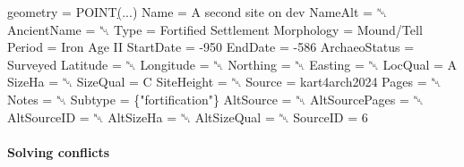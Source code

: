 \documentclass[
  letterpaper,
  DIV=11,
  numbers=noendperiod]{scrartcl}
\let\oldparagraph\paragraph
\renewcommand{\paragraph}[1]{\oldparagraph{#1}\mbox{}}
\newenvironment{Shaded}{\begin{snugshade}}{\end{snugshade}}
\newcommand{\AttributeTok}[1]{\textcolor[rgb]{1.00,0.47,0.78}{#1}}
\newcommand{\ErrorTok}[1]{\textcolor[rgb]{1.00,0.33,0.33}{\underline{#1}}}
\newcommand{\ExtensionTok}[1]{\textcolor[rgb]{0.55,0.91,0.99}{#1}}
\newcommand{\KeywordTok}[1]{\textcolor[rgb]{1.00,0.47,0.78}{#1}}
\newcommand{\NormalTok}[1]{\textcolor[rgb]{0.97,0.97,0.95}{#1}}
\newcommand{\StringTok}[1]{\textcolor[rgb]{0.95,0.98,0.55}{#1}}
\begin{document}
\begin{tcolorbox}
\begin{Shaded}
\begin{Highlighting}[]
                                \ExtensionTok{geometry}\NormalTok{ = POINT}\ErrorTok{(}\ExtensionTok{...}\KeywordTok{)}
                                    \ExtensionTok{Name}\NormalTok{ = A second site on dev}
                                 \ExtensionTok{NameAlt}\NormalTok{ = ␀}
                             \ExtensionTok{AncientName}\NormalTok{ = ␀}
                                    \ExtensionTok{Type}\NormalTok{ = Fortified Settlement}
                              \ExtensionTok{Morphology}\NormalTok{ = Mound/Tell}
                                  \ExtensionTok{Period}\NormalTok{ = Iron Age II}
                               \ExtensionTok{StartDate}\NormalTok{ = }\AttributeTok{{-}950}
                                 \ExtensionTok{EndDate}\NormalTok{ = }\AttributeTok{{-}586}
                           \ExtensionTok{ArchaeoStatus}\NormalTok{ = Surveyed}
                                \ExtensionTok{Latitude}\NormalTok{ = ␀}
                               \ExtensionTok{Longitude}\NormalTok{ = ␀}
                                \ExtensionTok{Northing}\NormalTok{ = ␀}
                                 \ExtensionTok{Easting}\NormalTok{ = ␀}
                                 \ExtensionTok{LocQual}\NormalTok{ = A}
                                  \ExtensionTok{SizeHa}\NormalTok{ = ␀}
                                \ExtensionTok{SizeQual}\NormalTok{ = C}
                              \ExtensionTok{SiteHeight}\NormalTok{ = ␀}
                                  \ExtensionTok{Source}\NormalTok{ = kart4arch2024}
                                   \ExtensionTok{Pages}\NormalTok{ = ␀}
                                   \ExtensionTok{Notes}\NormalTok{ = ␀}
                                 \ExtensionTok{Subtype}\NormalTok{ = \{}\StringTok{"fortification"}\NormalTok{\}}
                               \ExtensionTok{AltSource}\NormalTok{ = ␀}
                          \ExtensionTok{AltSourcePages}\NormalTok{ = ␀}
                             \ExtensionTok{AltSourceID}\NormalTok{ = ␀}
                               \ExtensionTok{AltSizeHa}\NormalTok{ = ␀}
                             \ExtensionTok{AltSizeQual}\NormalTok{ = ␀}
                                \ExtensionTok{SourceID}\NormalTok{ = 6}
\end{Highlighting}
\end{Shaded}

\end{tcolorbox}

\paragraph{Solving conflicts}\label{solving-conflicts}
\end{document}
